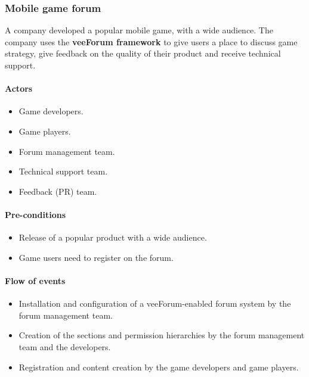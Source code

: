 \documentclass[12pt]{report}
\renewcommand\emph{\textbf}
\begin{document}
                    \subsubsection{Mobile game forum}
                        A company developed a popular mobile game, with a wide audience.
                        The company uses the \emph{veeForum framework} to give users a place to discuss game strategy, give feedback on the quality of their product and receive technical support.

                        \paragraph{Actors}
                            \begin{itemize}
                                \item Game developers.
                                \item Game players.
                                \item Forum management team.
                                \item Technical support team.
                                \item Feedback (PR) team.
                            \end{itemize}

                        \paragraph{Pre-conditions}
                            \begin{itemize}
                                \item Release of a popular product with a wide audience.
                                \item Game users need to register on the forum.
                            \end{itemize}

                        \paragraph{Flow of events}
                            \begin{itemize}
                                \item Installation and configuration of a veeForum-enabled forum system by the forum management team.
                                \item Creation of the sections and permission hierarchies by the forum management team and the developers.
                                \item Registration and content creation by the game developers and game players.
                            \end{itemize}
\end{document}
